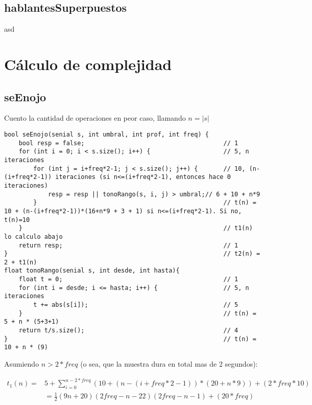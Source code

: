 \documentclass{article}
\begin{document}
\subsection{hablantesSuperpuestos}
asd

\newpage
{}
\section*{Cálculo de complejidad}
\vspace{0.5cm}
\subsection{seEnojo}
Cuento la cantidad de operaciones en peor caso, llamando $n=|s|$

\begin{lstlisting}
bool seEnojo(senial s, int umbral, int prof, int freq) {
    bool resp = false;                                      // 1
    for (int i = 0; i < s.size(); i++) {                    // 5, n iteraciones
        for (int j = i+freq*2-1; j < s.size(); j++) {       // 10, (n-(i+freq*2-1)) iteraciones (si n<=(i+freq*2-1), entonces hace 0 iteraciones)
            resp = resp || tonoRango(s, i, j) > umbral;// 6 + 10 + n*9
        }                                                   // t(n) = 10 + (n-(i+freq*2-1))*(16+n*9 + 3 + 1) si n<=(i+freq*2-1). Si no, t(n)=10
    }                                                       // t1(n) lo calculo abajo
    return resp;                                            // 1
}                                                           // t2(n) = 2 + t1(n)
float tonoRango(senial s, int desde, int hasta){
    float t = 0;                                            // 1
    for (int i = desde; i <= hasta; i++) {                  // 5, n iteraciones
        t += abs(s[i]);                                     // 5
    }                                                       // t(n) = 5 + n * (5+3+1)
    return t/s.size();                                      // 4
}                                                           // t(n) = 10 + n * (9)
\end{lstlisting}

Asumiendo $n > 2*freq$ (o sea, que la muestra dura en total mas de 2 segundos):

\begin{equation*}
\begin{split}
t_1(n) ={} & 5 + \sum_{i=0}^{n-2*freq}(10 + (n-(i+freq*2-1))*(20+n*9)) + (2*freq * 10)\\
      & = \frac{1}{2} (9 n + 20) (2 freq - n - 22) (2 freq - n - 1) + (20*freq)
\end{split}
\end{equation*}
\end{document}
